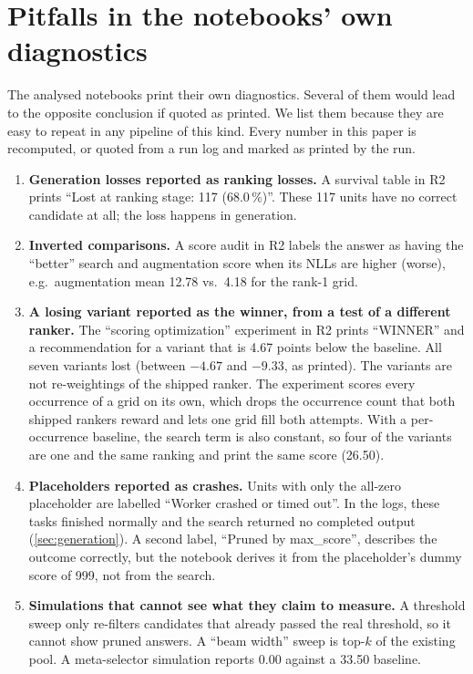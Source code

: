 \documentclass[11pt]{article}
\newcommand{\R}[1]{R#1}
\begin{document}
\section{Pitfalls in the notebooks' own diagnostics}
\label{sec:pitfalls}

The analysed notebooks print their own diagnostics. Several of them would lead to the opposite conclusion if quoted as printed. We list them because they are easy to repeat in any pipeline of this kind. Every number in this paper is recomputed, or quoted from a run log and marked as printed by the run.
\begin{enumerate}
\item \textbf{Generation losses reported as ranking losses.} A survival table in \R{2} prints ``Lost at ranking stage: 117 (68.0\,\%)''. These 117 units have no correct candidate at all; the loss happens in generation.
\item \textbf{Inverted comparisons.} A score audit in \R{2} labels the answer as having the ``better'' search and augmentation score when its NLLs are higher (worse), e.g.\ augmentation mean 12.78 vs.\ 4.18 for the rank-1 grid.
\item \textbf{A losing variant reported as the winner, from a test of a different ranker.} The ``scoring optimization'' experiment in \R{2} prints ``WINNER'' and a recommendation for a variant that is 4.67 points below the baseline. All seven variants lost (between $-4.67$ and $-9.33$, as printed).
The variants are not re-weightings of the shipped ranker. The experiment scores every occurrence of a grid on its own, which drops the occurrence count that both shipped rankers reward and lets one grid fill both attempts. With a per-occurrence baseline, the search term is also constant, so four of the variants are one and the same ranking and print the same score (26.50).
\item \textbf{Placeholders reported as crashes.} Units with only the all-zero placeholder are labelled ``Worker crashed or timed out''. In the logs, these tasks finished normally and the search returned no completed output (\cref{sec:generation}).
A second label, ``Pruned by max\_score'', describes the outcome correctly, but the notebook derives it from the placeholder's dummy score of 999, not from the search.
\item \textbf{Simulations that cannot see what they claim to measure.} A threshold sweep only re-filters candidates that already passed the real threshold, so it cannot show pruned answers. A ``beam width'' sweep is top-$k$ of the existing pool. A meta-selector simulation reports 0.00 against a 33.50 baseline.

\end{enumerate}
\end{document}
